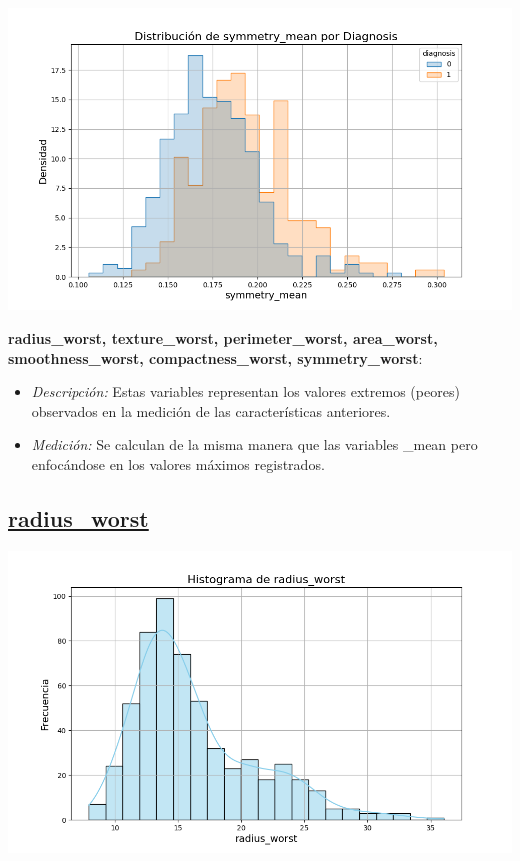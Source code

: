 \documentclass[a4paper, 12pt]{article}
\begin{document}
\includegraphics[width=\textwidth]{../Plots/plots_diagnosis/distribucion_symmetry_mean_por_diagnosis.png}

\newpage 

\textbf{radius\_worst, texture\_worst, perimeter\_worst, area\_worst, smoothness\_worst, compactness\_worst, symmetry\_worst}:
\begin{itemize}
	\item \textit{Descripción:} Estas variables representan los valores extremos (peores) observados en la medición de las características anteriores.
	\item \textit{Medición:} Se calculan de la misma manera que las variables \_mean pero enfocándose en los valores máximos registrados.
\end{itemize}



\subsection*{\underline{radius\_worst}}

	\includegraphics[width=\textwidth]{../Plots/plots_stats/radius_worst/histograma_radius_worst.png}
\end{document}
